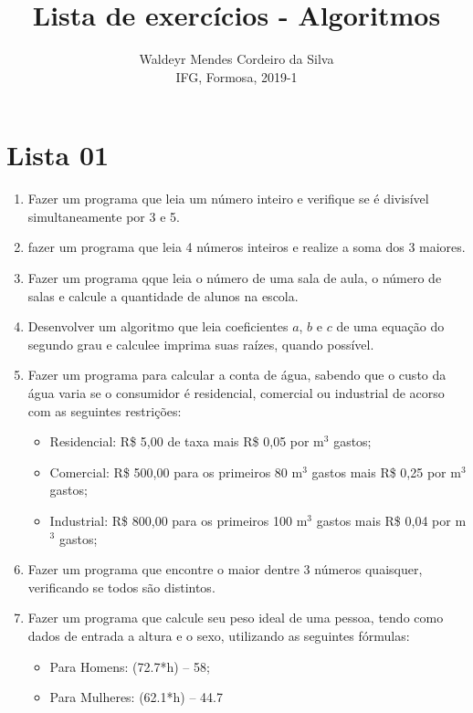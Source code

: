 \documentclass[a4paper]{article}
\title{Lista de exercícios - Algoritmos}
\author{Waldeyr Mendes Cordeiro da Silva\\IFG, Formosa, 2019-1}
\begin{document}
\maketitle

\section{Lista 01}

\begin{enumerate}
	\item Fazer um programa que leia um número inteiro e verifique se é divisível simultaneamente por 3 e 5.
	\item fazer um programa que leia 4 números inteiros e realize a soma dos 3 maiores.
	\item Fazer um programa qque leia o número de uma sala de aula, o número de salas e calcule a quantidade de alunos na escola.
	\item Desenvolver um algoritmo que leia coeficientes $a$, $b$ e $c$ de uma equação do segundo grau e calculee imprima suas raízes, quando possível.
	\item Fazer um programa para calcular a conta de água, sabendo que o custo da água varia se o consumidor é residencial, comercial ou industrial de acorso com as seguintes restrições:
	\begin{itemize}
		\item Residencial: R\$ 5,00 de taxa mais R\$ 0,05 por m$^3$ gastos;
		\item Comercial: R\$ 500,00 para os primeiros 80 m$^3$ gastos mais R\$ 0,25 por m$^3$ gastos;
		\item Industrial: R\$ 800,00 para os primeiros 100 m$^3$ gastos mais R\$ 0,04 por m$^3$ gastos;
	\end{itemize}
	\item Fazer um programa que encontre o maior dentre 3 números quaisquer, verificando se todos são distintos.
	\item Fazer um programa que calcule seu peso ideal de uma pessoa, tendo como dados de entrada a altura e o sexo, utilizando as seguintes fórmulas:
	\begin{itemize}
		\item Para Homens: (72.7*h) – 58;
		\item Para Mulheres: (62.1*h) – 44.7
	\end{itemize}
\end{enumerate}
\end{document}
